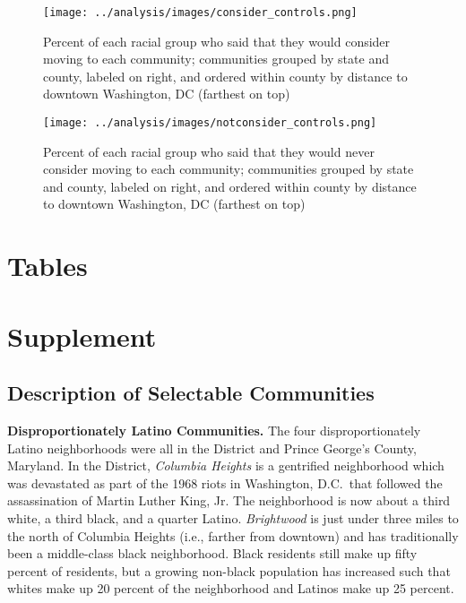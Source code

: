 \documentclass[11pt]{baderart}
\begin{document}
\begin{sidewaysfigure}
\texttt{[image: ../analysis/images/consider\_controls.png]}
\caption{Percent of each racial group who said that they would consider moving to each community; communities grouped by state and county, labeled on right, and ordered within county by distance to downtown Washington, DC (farthest on top)}
\label{fig:consider}
\end{sidewaysfigure}

\begin{sidewaysfigure}
\texttt{[image: ../analysis/images/notconsider\_controls.png]}
\caption{Percent of each racial group who said that they would never consider moving to each community; communities grouped by state and county, labeled on right, and ordered within county by distance to downtown Washington, DC (farthest on top)}
\label{fig:notconsider}
\end{sidewaysfigure}


\clearpage
\section{Tables}








\clearpage
\section{Supplement}
\subsection{Description of Selectable Communities}
\textbf{Disproportionately Latino Communities.} The four disproportionately Latino neighborhoods were all in the District and Prince George's County, Maryland. In the District,  \emph{Columbia Heights} is a gentrified neighborhood which was devastated as part of the 1968 riots in Washington, D.C.\ that followed the assassination of Martin Luther King, Jr. The neighborhood is now about a third white, a third black, and a quarter Latino. \emph{Brightwood} is just under three miles to the north of Columbia Heights (i.e., farther from downtown) and has traditionally been a middle-class black neighborhood. Black residents still make up fifty percent of residents, but a growing non-black population has increased such that whites make up 20 percent of the neighborhood and Latinos make up 25 percent. 
\end{document}
